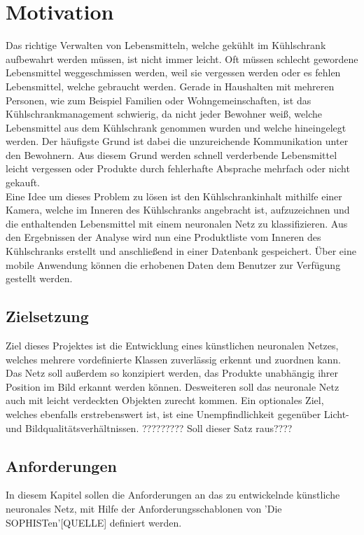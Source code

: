 \documentclass[a4paper,12pt,oneside]{article}
\begin{document}
  \newpage
  
  \tableofcontents
  \newpage
  \listoffigures
 
  
  \newpage
  \pagestyle{plain}
  \setcounter{page}{1}
   
  
  \section{Motivation}
Das richtige Verwalten von Lebensmitteln, welche gekühlt im Kühlschrank aufbewahrt werden müssen, ist nicht immer leicht. Oft müssen schlecht gewordene Lebensmittel weggeschmissen werden, weil sie vergessen werden oder es fehlen Lebensmittel, welche gebraucht werden. Gerade in Haushalten mit mehreren Personen, wie zum Beispiel Familien oder Wohngemeinschaften, ist das Kühlschrankmanagement schwierig, da nicht jeder Bewohner weiß, welche Lebensmittel aus dem Kühlschrank genommen wurden und welche hineingelegt werden. Der häufigste Grund ist dabei die unzureichende Kommunikation unter den Bewohnern. Aus diesem Grund werden schnell verderbende Lebensmittel leicht vergessen oder Produkte durch fehlerhafte Absprache mehrfach oder nicht gekauft. \\ Eine Idee um dieses Problem zu lösen ist den Kühlschrankinhalt mithilfe einer Kamera, welche im Inneren des Kühlschranks angebracht ist, aufzuzeichnen und die enthaltenden Lebensmittel mit einem neuronalen Netz zu klassifizieren. Aus den Ergebnissen der Analyse wird nun eine Produktliste vom Inneren des Kühlschranks erstellt und anschließend in einer Datenbank gespeichert. Über eine mobile Anwendung können die erhobenen Daten dem Benutzer zur Verfügung gestellt werden.
  
  \subsection{Zielsetzung} 
Ziel dieses Projektes ist die Entwicklung eines künstlichen neuronalen Netzes, welches mehrere vordefinierte Klassen zuverlässig erkennt und zuordnen kann. Das Netz soll außerdem so konzipiert werden, das Produkte unabhängig ihrer Position im Bild erkannt werden können. Desweiteren soll das neuronale Netz auch mit leicht verdeckten Objekten zurecht kommen. Ein optionales Ziel, welches ebenfalls erstrebenswert ist, ist eine Unempfindlichkeit gegenüber Licht- und Bildqualitätsverhältnissen.  ????????? Soll dieser Satz raus????

\newpage
	
  \subsection{Anforderungen}
In diesem Kapitel sollen die Anforderungen an das zu entwickelnde künstliche neuronales Netz, mit Hilfe der Anforderungsschablonen von 'Die SOPHISTen'[QUELLE] definiert werden. 
  
\end{document}
